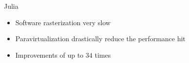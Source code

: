 \begin{frame}
\begin{columns}
    \begin{block}{Julia}
      \begin{itemize}
      \item Software rasterization very slow
      \item Paravirtualization drastically reduce the performance hit
      \item Improvements of up to $34$ times
      \end{itemize}
    \end{block}
  \end{columns}

\end{frame}
